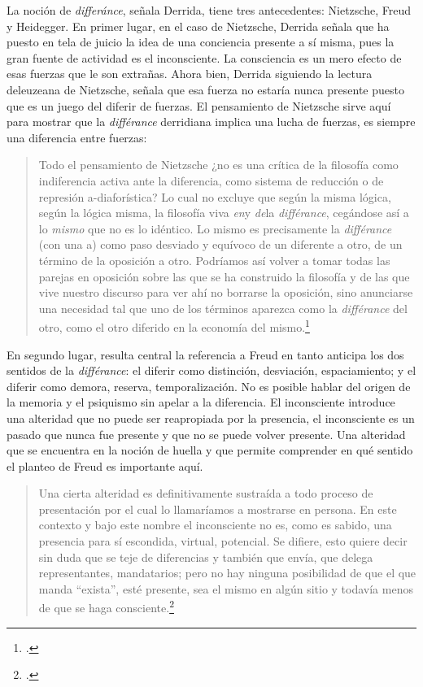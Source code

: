 La noción de \emph{differánce}, señala Derrida, tiene tres antecedentes: Nietzsche, Freud y Heidegger. En primer lugar, en el caso de Nietzsche, Derrida señala que ha puesto en tela de juicio la idea de una conciencia presente a sí misma, pues la gran fuente de actividad es el inconsciente. La consciencia es un mero efecto  \linebreak de esas fuerzas que le son extrañas. Ahora bien, Derrida siguiendo la lectura deleuzeana de Nietzsche, señala que esa fuerza no estaría nunca presente puesto que es un juego del diferir de fuerzas. El pensamiento de Nietzsche sirve aquí para mostrar que la \emph{différance} derridiana implica una lucha de fuerzas, es siempre una diferencia entre fuerzas:

\begin{quote}
Todo el pensamiento de Nietzsche ¿no es una crítica de la filosofía como indiferencia activa ante la diferencia, como sistema de reducción o de represión a-diaforística? Lo cual no excluye que según la misma lógica, según la lógica misma, la filosofía viva \emph{en}y \emph{de}la \emph{différance}, cegándose así a lo \emph{mismo} que no es lo idéntico. Lo mismo es precisamente la \emph{différance} (con una a) como paso desviado y equívoco de un diferente a otro, de un término de la oposición a otro. Podríamos así volver a tomar todas las parejas en oposición sobre las que se ha construido la filosofía y de las que vive nuestro discurso para ver ahí no borrarse la oposición, sino anunciarse una necesidad tal que uno de los términos aparezca como la \emph{différance} del otro, como el otro diferido en la economía del mismo.\footcite[18]{@6983-DERRIDA1989}

\end{quote}

En segundo lugar, resulta central la referencia a Freud en tanto anticipa los dos sentidos de la \emph{différance}: el diferir como distinción, desviación, espaciamiento; y el diferir como demora, reserva, temporalización. No es posible hablar del origen de la memoria y el psiquismo sin apelar a la diferencia. El inconsciente introduce una alteridad que no puede ser reapropiada por la presencia, el inconsciente es un pasado que nunca fue presente y que no se puede volver presente. Una alteridad que se encuentra en la noción de huella y que permite comprender en qué sentido el planteo de Freud es importante aquí.

\begin{quote}
Una cierta alteridad  es definitivamente sustraída a todo proceso de presentación por el cual lo llamaríamos a mostrarse en persona. En este contexto y bajo este nombre el inconsciente no es, como es sabido, una presencia para sí escondida, virtual, potencial. Se difiere, esto quiere decir sin duda que se teje de diferencias y también que envía, que delega representantes, mandatarios; pero no hay ninguna posibilidad de que el que manda \enquote{exista}, esté presente, sea el mismo en algún sitio y todavía menos de que se haga consciente.\footcite[21]{@6983-DERRIDA1989}
\end{quote}

